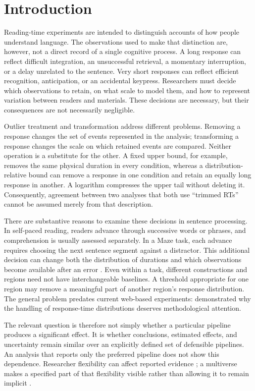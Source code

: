 \section{Introduction}

Reading-time experiments are intended to distinguish accounts of how people
understand language. The observations used to make that distinction are,
however, not a direct record of a single cognitive process. A long response
can reflect difficult integration, an unsuccessful retrieval, a momentary
interruption, or a delay unrelated to the sentence. Very short responses can
reflect efficient recognition, anticipation, or an accidental keypress.
Researchers must decide which observations to retain, on what scale to model
them, and how to represent variation between readers and materials. These
decisions are necessary, but their consequences are not necessarily negligible.

Outlier treatment and transformation address different problems. Removing a
response changes the set of events represented in the analysis; transforming
a response changes the scale on which retained events are compared. Neither
operation is a substitute for the other. A fixed upper bound, for example,
removes the same physical duration in every condition, whereas a
distribution-relative bound can remove a response in one condition and retain
an equally long response in another. A logarithm compresses the upper tail
without deleting it. Consequently, agreement between two analyses that both
use ``trimmed RTs'' cannot be assumed merely from that description.

There are substantive reasons to examine these decisions in sentence
processing. In self-paced reading, readers advance through successive words
or phrases, and comprehension is usually assessed separately. In a Maze
task, each advance requires choosing the next sentence segment against a
distractor. This additional decision can change both the distribution of
durations and which observations become available after an error
\citep{boyce_maze_2020}. Even within a task, different constructions and
regions need not have interchangeable baselines. A threshold appropriate
for one region may remove a meaningful part of another region's response
distribution. The general problem predates current web-based experiments:
\citet{ratcliff_methods_1993} demonstrated why the handling of response-time
distributions deserves methodological attention.

The relevant question is therefore not simply whether a particular pipeline
produces a significant effect. It is whether conclusions, estimated effects,
and uncertainty remain similar over an explicitly defined set of defensible
pipelines. An analysis that reports only the preferred pipeline does not show
this dependence. Researcher flexibility can affect reported evidence
\citep{simmons_false-positive_2011}; a multiverse makes a specified part of
that flexibility visible rather than allowing it to remain implicit
\citep{steegen_multiverse_2016,simonsohn_specification_2020}.

